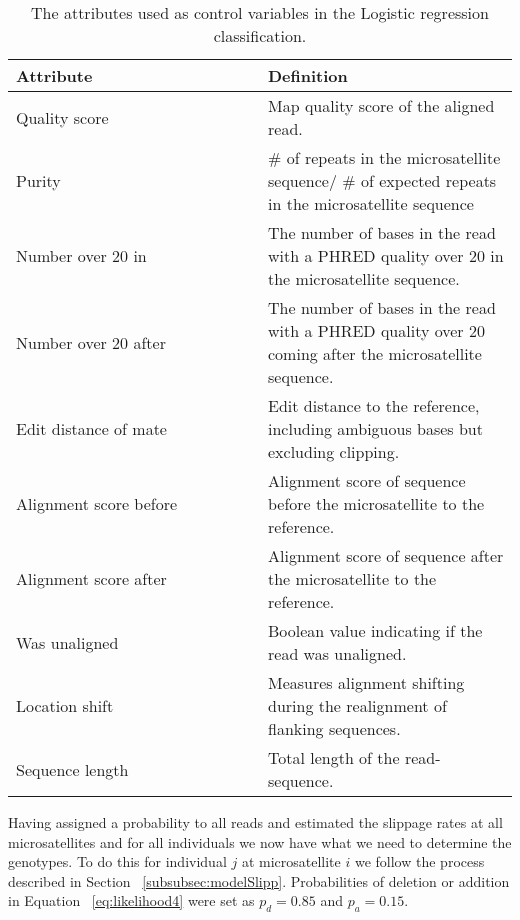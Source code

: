 \documentclass{bioinfo}
\begin{document}
    \begin{table*}[ht]
        \caption{The attributes used as control variables in the Logistic regression classification.}
        \begin{tabular}{p{0.5\linewidth}|p{0.5\linewidth}}
            \hline
            \textbf{Attribute} & \textbf{Definition} \\ \hline
            Quality score & Map quality score of the aligned read. \\ \hline
            Purity & \# of repeats in the microsatellite sequence/ 
            \# of expected repeats in the microsatellite sequence \\ \hline
            Number over 20 in & The number of bases in the read with a PHRED quality over 20 in the microsatellite sequence. \\ \hline
            Number over 20 after & The number of bases in the read with a PHRED quality over 20 coming after the microsatellite sequence. \\ \hline
            Edit distance of mate & Edit distance to the reference, including ambiguous bases but excluding clipping. \\ \hline
            Alignment score before & Alignment score of sequence before the microsatellite to the reference. \\ \hline
            Alignment score after & Alignment score of sequence after the microsatellite to the reference. \\ \hline
            Was unaligned & Boolean value indicating if the read was unaligned. \\ \hline
            Location shift & Measures alignment shifting during the realignment of flanking sequences. \\ \hline
            Sequence length & Total length of the read-sequence. \\
            \hline
        \end{tabular}
        \label{table:attributes}
    \end{table*}
    
    Having assigned a probability to all reads and estimated the slippage rates at all microsatellites and for all individuals we now have what we need to determine the genotypes. To do this for individual $j$ at microsatellite $i$ we follow the process described in Section ~\ref{subsubsec:modelSlipp}. Probabilities of deletion or addition in Equation ~\ref{eq:likelihood4} were set as $p_d = 0.85$ and $p_a = 0.15$. 
\end{document}
